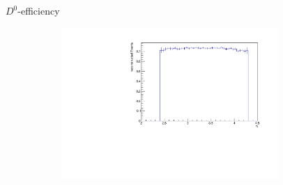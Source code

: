 \documentclass[11pt]{beamer}
\begin{document}
\begin{frame}{$D^0$-efficiency}
\begin{figure}
\begin{subfigure}{0.45\textwidth}
\end{subfigure}
\begin{subfigure}{0.45\textwidth}
\includegraphics[width=0.9\textwidth]{up_pdf/pos/h_eta_reco_D0_pos.pdf}
\end{subfigure}
\end{figure}
\end{frame}
\end{document}
